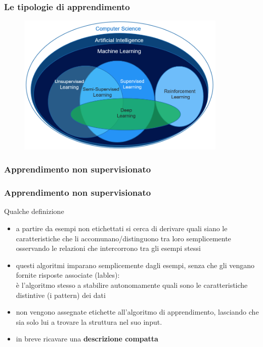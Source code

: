 \begin{frame}

	\frametitle{Le tipologie di apprendimento}

	\begin{figure}[!htbp]
		\centering
		\includegraphics[width=10cm]{images/glossary/learning_types.png}
	\end{figure}

\end{frame}


\subsubsection{Apprendimento non supervisionato}

\begin{frame}

	\frametitle{Apprendimento non supervisionato}

	\begin{block}{Qualche definizione}
		\begin{itemize}
			\item a partire da esempi non etichettati si cerca di derivare quali siano le caratteristiche che li accomunano/distinguono tra loro semplicemente osservando le relazioni che intercorrono tra gli esempi stessi
			\item questi algoritmi imparano semplicemente dagli esempi, senza che gli vengano fornite risposte associate (lables):\\
				è l'algoritmo stesso a stabilire autonomamente quali sono le caratteristiche distintive (i pattern) dei dati
			\item non vengono assegnate etichette all'algoritmo di apprendimento, lasciando che sia solo lui a trovare la struttura nel suo input.
			\item in breve ricavare una \textbf{descrizione compatta}
		\end{itemize}

	\end{block}


\end{frame}



